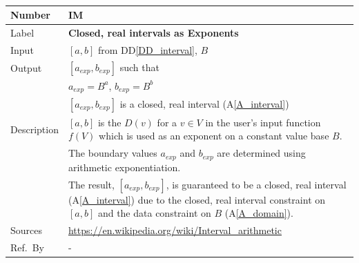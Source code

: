 \documentclass[12pt]{article}
\newcommand{\colAwidth}{0.13\textwidth}
\newcommand{\colBwidth}{0.82\textwidth}
\newcommand{\ddref}[1]{DD\ref{#1}}
\newcommand{\aref}[1]{A\ref{#1}}
\newcounter{instnum} %
\begin{document}
~\newline

\noindent
\begin{minipage}{\textwidth}
	\renewcommand*{\arraystretch}{1.5}
	\begin{tabular}{| p{\colAwidth} | p{\colBwidth}|}
		\hline
		\rowcolor[gray]{0.9}
		Number& IM{instnum}\theinstnum \label{I_exponents}\\
		\hline
		Label& \bf  Closed, real intervals as Exponents\\
		\hline
		Input&$[a, b]$ from \ddref{DD_interval}, $B$\\
		\hline
		Output&$[a_{exp}, b_{exp}]$ such that\\
		&$a_{exp} = B^a$, $b_{exp} = B^b$\\
		&$[a_{exp}, b_{exp}]$ is a closed, real interval (\aref{A_interval}) \\
		\hline
		Description&$[a, b]$ is the $D(v)$ for a $v \in V$ in the user's input 
		function $f(V)$ which is used as an exponent on a constant value base 
		$B$. \\
		&The boundary values $a_{exp}$ and $b_{exp}$ are determined 
		using arithmetic exponentiation.\\
		& The result, $[a_{exp}, b_{exp}]$, is guaranteed to be a closed, real 
		interval (\aref{A_interval}) due to the closed, real interval 
		constraint on $[a, b]$ and the data constraint on $B$ (\aref{A_domain}).
		\\
		\hline
		Sources& \url{https://en.wikipedia.org/wiki/Interval_arithmetic} \\
		\hline
		Ref.\ By & -\\
		\hline
	\end{tabular}
\end{minipage}\\

~\newline
\end{document}
